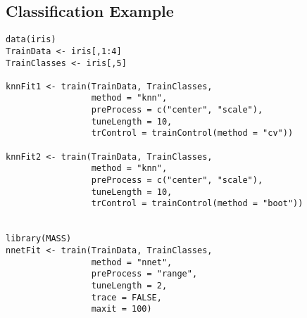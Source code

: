 
\subsection{Classification Example}
\begin{framed} 
\begin{verbatim} 
data(iris)
TrainData <- iris[,1:4]
TrainClasses <- iris[,5]
 
knnFit1 <- train(TrainData, TrainClasses,
                 method = "knn",
                 preProcess = c("center", "scale"),
                 tuneLength = 10,
                 trControl = trainControl(method = "cv"))
 
knnFit2 <- train(TrainData, TrainClasses,
                 method = "knn",
                 preProcess = c("center", "scale"),
                 tuneLength = 10, 
                 trControl = trainControl(method = "boot"))
 
 
library(MASS)
nnetFit <- train(TrainData, TrainClasses,
                 method = "nnet",
                 preProcess = "range", 
                 tuneLength = 2,
                 trace = FALSE,
                 maxit = 100)

\end{verbatim}
\end{framed}
